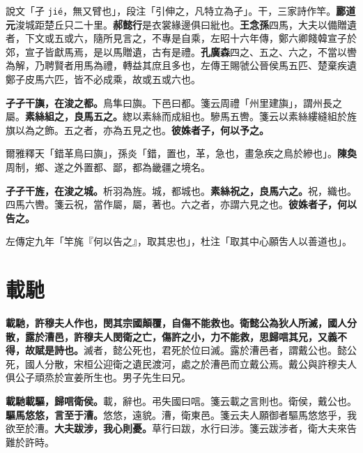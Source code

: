 \begin{quoting}說文「孑 \texttt{jié}，無又臂也」，段注「引伸之，凡特立為孑」。干，三家詩作竿。\textbf{酈道元}浚城距楚丘只二十里。\textbf{郝懿行}是衣裳緣邊俱曰紕也。\textbf{王念孫}四馬，大夫以備贈遺者，下文或五或六，隨所見言之，不專是自乘，左昭十六年傳，鄭六卿餞韓宣子於郊，宣子皆獻馬焉，是以馬贈遺，古有是禮。\textbf{孔廣森}四之、五之、六之，不當以轡為解，乃聘賢者用馬為禮，轉益其庶且多也，左傳王賜虢公晉侯馬五匹、楚棄疾遺鄭子皮馬六匹，皆不必成乘，故或五或六也。\end{quoting}

\textbf{孑孑干旟，在浚之都。}{\footnotesize 鳥隼曰旟。下邑曰都。箋云周禮「州里建旟」，謂州長之屬。}\textbf{素絲組之，良馬五之。}{\footnotesize 緫以素絲而成組也。驂馬五轡。箋云以素絲縷縫組於旌旗以為之飾。五之者，亦為五見之也。}\textbf{彼姝者子，何以予之。}

\begin{quoting}爾雅釋天「錯革鳥曰旟」，孫炎「錯，置也，革，急也，畫急疾之鳥於縿也」。\textbf{陳奐}周制，鄉、遂之外置都、鄙，都為畿疆之境名。\end{quoting}

\textbf{孑孑干旌，在浚之城。}{\footnotesize 析羽為旌。城，都城也。}\textbf{素絲祝之，良馬六之。}{\footnotesize 祝，織也。四馬六轡。箋云祝，當作屬，屬，著也。六之者，亦謂六見之也。}\textbf{彼姝者子，何以告之。}

\begin{quoting}左傳定九年「竿旄『何以告之』，取其忠也」，杜注「取其中心願吿人以善道也」。\end{quoting}

\section{載馳}


\textbf{載馳，許穆夫人作也，閔其宗國顛覆，自傷不能救也。衛懿公為狄人所滅，國人分散，露於漕邑，許穆夫人閔衛之亡，傷許之小，力不能救，思歸唁其兄，又義不得，故賦是詩也。}{\footnotesize 滅者，懿公死也，君死於位曰滅。露於漕邑者，謂戴公也。懿公死，國人分散，宋桓公迎衛之遺民渡河，處之於漕邑而立戴公焉。戴公與許穆夫人俱公子頑烝於宣姜所生也。男子先生曰兄。}

\textbf{載馳載驅，歸唁衛侯。}{\footnotesize 載，辭也。弔失國曰唁。箋云載之言則也。衛侯，戴公也。}\textbf{驅馬悠悠，言至于漕。}{\footnotesize 悠悠，遠貌。漕，衛東邑。箋云夫人願御者驅馬悠悠乎，我欲至於漕。}\textbf{大夫跋涉，我心則憂。}{\footnotesize 草行曰跋，水行曰涉。箋云跋涉者，衛大夫來告難於許時。}

